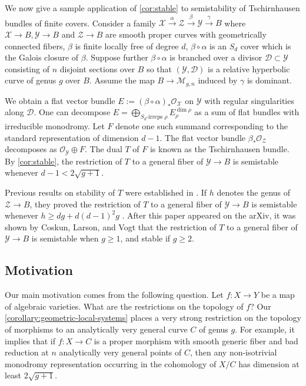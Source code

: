 \begin{example}
\notready
	\label{example:tschirnhausen}
	We now give a sample application of \autoref{cor:stable} to
	semistability of Tschirnhausen bundles of finite covers.
	Consider a family $\mathscr X \xrightarrow{\alpha} \mathscr{Z}
	\xrightarrow{\beta} \mathscr Y
	\xrightarrow{\gamma} B$
	where $\mathscr X \to B, \mathscr Y \to B$ and $\mathscr Z \to B$ are smooth proper curves
	with geometrically connected fibers,
	$\beta$ is finite locally free of degree $d$, $\beta\circ \alpha$ is an $S_d$ cover
	which is the Galois closure of $\beta$.
	Suppose further $\beta \circ \alpha$ is branched
	over a divisor $\mathscr D \subset \mathscr Y$ consisting of $n$ disjoint sections over $B$ so that
	$(\mathscr Y, \mathscr D)$ is a relative hyperbolic curve of genus $g$ over $B$.
	Assume the map $B \to \mathscr M_{g,n}$ induced by $\gamma$
	is dominant.

	We obtain a flat vector bundle $E := (\beta \circ \alpha)_* \mathscr
	O_{\mathscr X}$ on $\mathscr Y$ with regular singularities along
	$\mathscr D$.
	One can decompose $E = \bigoplus\limits_{S_d \text{-irreps }
	\rho} E_\rho^{\dim \rho}$ as a sum of flat bundles with irreducible
	monodromy. Let $F$ denote one such
	summand corresponding to the standard representation of dimension $d-1$.
	The flat vector bundle $\beta_* \mathscr O_{\mathscr Z}$ decomposes as
	$\mathscr O_{\mathscr Y} \oplus F$.
	The dual $T$ of $F$ is known
	as the Tschirnhausen bundle.
	By \autoref{cor:stable},
	the restriction of $T$ to a general fiber of $\mathscr Y \to B$
	is semistable whenever $d -1 < 2 \sqrt{g+1}$.

	Previous results on stability of $T$ were established in
	\cite[Theorem 1.5]{deopurkarP:vector-bundles-and-finite-covers}.
	If $h$ denotes the genus of $\mathscr Z \to B$, they proved the
	restriction of $T$ to a general fiber of $\mathscr Y \to B$ is
	semistable whenever $h \geq dg + d(d-1)^2 g$
	\cite[Remark 3.16]{deopurkarP:vector-bundles-and-finite-covers}. After this paper appeared on the arXiv, it was shown by Coskun, Larson, and Vogt \cite{coskun2022stability} that the restriction of $T$ to a general fiber of $\mathscr Y \to B$
	is semistable when $g\geq 1$, and stable if $g\geq 2$.
\end{example}



\subsection{Motivation}
 Our main motivation comes from the following question. Let $f: X\to Y$ be a map
 of algebraic varieties. What are the restrictions on the topology of $f$? Our
 \autoref{corollary:geometric-local-systems} places a very strong restriction on
 the topology of morphisms to an analytically very general curve $C$ of genus
 $g$. For example, it implies that if $f: X\to C$ is a proper morphism with smooth generic fiber and bad reduction at $n$ analytically very general points of $C$, then any non-isotrivial monodromy representation occurring in the cohomology of $X/C$ has dimension at least $2\sqrt{g+1}$.

